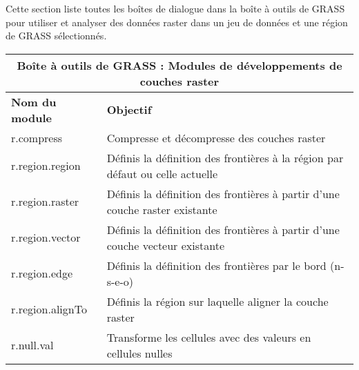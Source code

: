 Cette section liste toutes les boîtes de dialogue dans la boîte à outils de GRASS pour utiliser et analyser des données raster dans un jeu de données et une région de GRASS sélectionnés.
\begin{table}[H]
\centering
 \begin{tabular}{|p{4cm}|p{10cm}|}
  \hline \multicolumn{2}{|c|}{\textbf{Boîte à outils de GRASS : Modules de développements de couches raster}} \\
  \hline \textbf{Nom du module} & \textbf{Objectif} \\
  \hline r.compress & Compresse et décompresse des couches raster \\
  \hline r.region.region & Définis la définition des frontières à la région par défaut ou celle actuelle \\
  \hline r.region.raster & Définis la définition des frontières à partir d'une couche raster existante \\
  \hline r.region.vector & Définis la définition des frontières à partir d'une couche vecteur existante \\
  \hline r.region.edge & Définis la définition des frontières par le bord (n-s-e-o) \\
  \hline r.region.alignTo & Définis la région sur laquelle aligner la couche raster \\
  \hline r.null.val & Transforme les cellules avec des valeurs en cellules nulles\\

\end{tabular}
\end{table}
